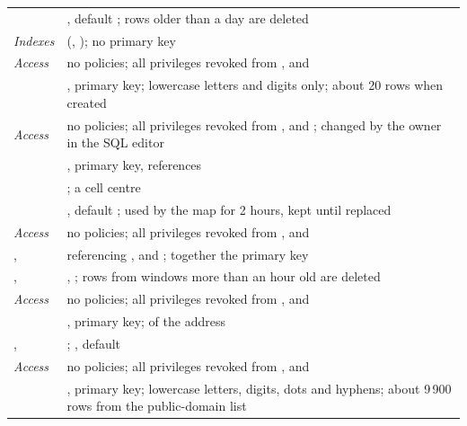 \begin{longtable}{@{}L{44mm}L{\dimexpr\linewidth-44mm-2\tabcolsep\relax}@{}}
   & , default ; rows older than a day are deleted \\
  \emph{Indexes} &  (, ); no primary key \\
  \emph{Access} & no policies; all privileges revoked from ,  and  \\[3pt]
   & , primary key; lowercase letters and digits only; about 20 rows when created \\
  \emph{Access} & no policies; all privileges revoked from ,  and ; changed by the owner in the SQL editor \\[3pt]
   & , primary key, references  \\
   & ; a cell centre \\
   & , default ; used by the map for 2 hours, kept until replaced \\
  \emph{Access} & no policies; all privileges revoked from ,  and  \\[3pt]
  ,  &  referencing , and ; together the primary key \\
  ,  & , ; rows from windows more than an hour old are deleted \\
  \emph{Access} & no policies; all privileges revoked from ,  and  \\[3pt]
   & , primary key;  of the address \\
  ,  & ; , default  \\
  \emph{Access} & no policies; all privileges revoked from ,  and  \\[3pt]
   & , primary key; lowercase letters, digits, dots and hyphens; about 9\,900 rows from the public-domain list \\

\end{longtable}
